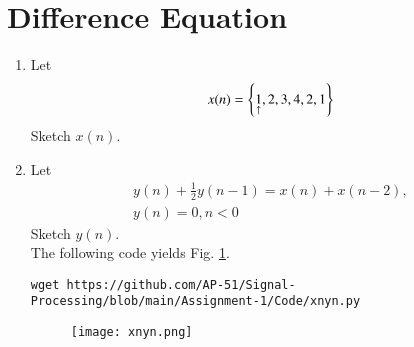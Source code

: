 \documentclass[journal,12pt,twocolumn]{IEEEtran}
\renewcommand\thesection{\arabic{section}}
\begin{document}
\section{Difference Equation}
\begin{enumerate}[label=\thesection.\arabic*,ref=\thesection.\theenumi]
\item Let
\begin{equation}
x(n) = \left\{\underset{\uparrow}{1},2,3,4,2,1\right\}
\end{equation}
Sketch $x(n)$.
\item Let
\begin{multline}
\label{eq:iir_filter}
y(n) + \frac{1}{2}y(n-1) = x(n) + x(n-2), 
\\
 y(n) = 0, n < 0
\end{multline}
Sketch $y(n)$.
\\
\solution The following code yields Fig. \ref{fig:xnyn}.
\begin{lstlisting}
wget https://github.com/AP-51/Signal-Processing/blob/main/Assignment-1/Code/xnyn.py
\end{lstlisting}
\begin{figure}[!ht]
\begin{center}
\texttt{[image: xnyn.png]}
\end{center}
\label{fig:xnyn}	
\end{figure}
\end{enumerate}
\end{document}
